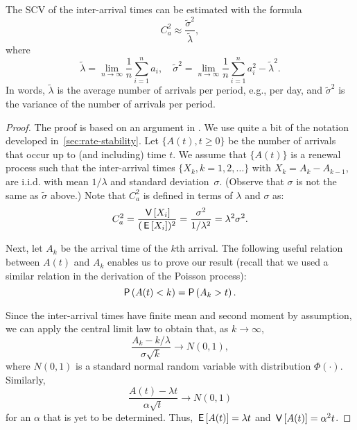 \begin{theorem} The SCV of the inter-arrival times can be estimated
 with the formula
\begin{equation*}
C_a^2 \approx \frac{\tilde \sigma^2}{\tilde \lambda},
\end{equation*}
where 
\begin{equation*}
\tilde \lambda = \lim_{n\to\infty} \frac 1n \sum_{i=1}^n a_i,\quad 
\tilde \sigma^2 = \lim_{n\to\infty} \frac 1 n \sum_{i=1}^n a_i^2 - \tilde \lambda^2.
\end{equation*}
In words, $\tilde \lambda$ is the average number of arrivals per period, e.g., per day, and $\tilde \sigma^2 $ is the variance of the number of arrivals per period.
\end{theorem}

\begin{proof}
 The proof is based on an argument in \cite{cox62:_renew_theor}.
 We use quite a bit of the notation developed in~\cref{sec:rate-stability}.
 Let $\{A(t), t\geq 0\}$ be the number of arrivals that occur up to (and including) time $t$.
 We assume that $\{A(t)\}$ is a renewal process such that the inter-arrival times $\{X_k, k=1, 2, \ldots\}$ with $X_k = A_{k}-A_{k-1}$, are i.i.d.
 with mean $1/\lambda$ and standard deviation~$\sigma$.
 (Observe that $\sigma$ is not the same as $\tilde \sigma$ above.)
 Note that $C_a^2$ is defined in terms of $\lambda$ and $\sigma$ as:
\begin{equation*}
C_a^2 = \frac{\,\mathsf{V}\left[X_i\right]}{(\,\mathsf{E}\left[X_i\right])^2} = \frac{\sigma^2}{1/\lambda^2} = \lambda^2 \sigma^2.
\end{equation*}

Next, let $A_k$ be the arrival time of the $k$th arrival.
The following useful relation between $A(t)$ and $A_k$ enables us to prove our result (recall that we used a similar relation in the derivation of the Poisson process):
\begin{equation*}
\P{A(t) < k} = \P{A_k > t}.
\end{equation*}

Since the inter-arrival times have finite mean and second moment by assumption, we can apply the central limit law to obtain that, as $k\to\infty$,
\begin{equation*}
\frac{A_k -k/\lambda}{\sigma \sqrt k} \to N(0,1),
\end{equation*}
where $N(0,1)$ is a standard normal random variable with
distribution $\Phi(\cdot)$. Similarly,
%
\begin{equation*}
\frac{A(t) -\lambda t}{\alpha \sqrt t} \to N(0,1)
\end{equation*}
for an $\alpha$ that is yet to be determined. Thus,
$\,\mathsf{E}\left[A(t)\right] = \lambda t$ and $\,\mathsf{V}\left[A(t)\right]=\alpha^2 t$.


\end{proof}

